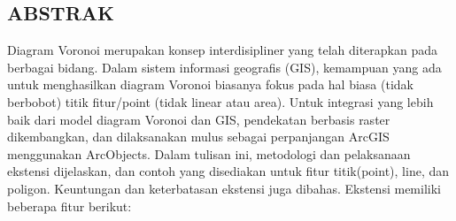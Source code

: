 \subsection{ABSTRAK}
Diagram  Voronoi merupakan konsep interdisipliner yang telah diterapkan pada berbagai bidang. Dalam sistem informasi geografis (GIS), kemampuan yang ada untuk menghasilkan diagram Voronoi biasanya fokus pada hal biasa (tidak berbobot) titik fitur/point (tidak linear atau area). Untuk integrasi yang lebih baik dari model diagram Voronoi dan GIS, pendekatan berbasis raster dikembangkan, dan dilaksanakan mulus sebagai perpanjangan ArcGIS menggunakan ArcObjects. Dalam tulisan ini, metodologi dan pelaksanaan ekstensi dijelaskan, dan contoh yang disediakan untuk fitur titik(point), line, dan poligon. Keuntungan dan keterbatasan ekstensi juga dibahas. Ekstensi memiliki beberapa fitur berikut: 
